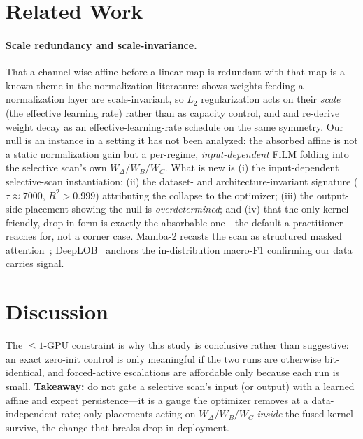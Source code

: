 \documentclass{article}
\begin{document}
\section{Related Work}\label{sec:related}

\paragraph{Scale redundancy and scale-invariance.}
That a channel-wise affine before a linear map is redundant with that map is a known
theme in the normalization literature: \citet{vanlaarhoven2017l2} shows weights
feeding a normalization layer are scale-invariant, so $L_2$ regularization acts on
their \emph{scale} (the effective learning rate) rather than as capacity control,
and \citet{hoffer2018norm} and \citet{li2020exp} re-derive weight decay as an
effective-learning-rate schedule on the same symmetry. Our null is an instance in a
setting it has not been analyzed: the absorbed affine is not a static normalization
gain but a per-regime, \emph{input-dependent} FiLM folding into the selective
scan's own $W_\Delta/W_B/W_C$. What is new is (i) the input-dependent
selective-scan instantiation; (ii) the dataset- and architecture-invariant
signature ($\tau\approx7000$, $R^2>0.999$) attributing the collapse to the
optimizer; (iii) the output-side placement showing the null is
\emph{overdetermined}; and (iv) that the only kernel-friendly, drop-in form is
exactly the absorbable one---the default a practitioner reaches for, not a corner
case. Mamba-2 recasts the scan as structured masked
attention~\citep{dao2024mamba2}; DeepLOB~\citep{zhang2019deeplob} anchors the
in-distribution macro-F1 confirming our data carries signal.

\section{Discussion}\label{sec:discussion}

The $\le1$-GPU constraint is why this study is conclusive rather than suggestive:
an exact zero-init control is only meaningful if the two runs are otherwise
bit-identical, and forced-active escalations are affordable only because each run is
small. \textbf{Takeaway:} do not gate a selective scan's input (or output) with a
learned affine and expect persistence---it is a gauge the optimizer removes at a
data-independent rate; only placements acting on $W_\Delta/W_B/W_C$ \emph{inside}
the fused kernel survive, the change that breaks drop-in deployment.
\end{document}
